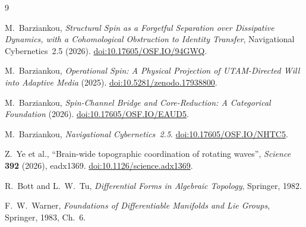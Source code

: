 \documentclass[11pt]{article}
\theoremstyle{definition}
\begin{document}
\begin{thebibliography}{9}

M.~Barziankou,
\emph{Structural Spin as a Forgetful Separation over Dissipative
Dynamics, with a Cohomological Obstruction to Identity Transfer},
Navigational Cybernetics~2.5 (2026).
\href{https://doi.org/10.17605/OSF.IO/94GWQ}
{doi:10.17605/OSF.IO/94GWQ}.

M.~Barziankou,
\emph{Operational Spin: A Physical Projection of UTAM-Directed Will into
Adaptive Media} (2025).
\href{https://doi.org/10.5281/zenodo.17938800}
{doi:10.5281/zenodo.17938800}.

M.~Barziankou,
\emph{Spin-Channel Bridge and Core-Reduction: A Categorical Foundation}
(2026).
\href{https://doi.org/10.17605/OSF.IO/EAUD5}
{doi:10.17605/OSF.IO/EAUD5}.

M.~Barziankou,
\emph{Navigational Cybernetics~2.5}.
\href{https://doi.org/10.17605/OSF.IO/NHTC5}
{doi:10.17605/OSF.IO/NHTC5}.

Z.~Ye et al.,
``Brain-wide topographic coordination of rotating waves'',
\emph{Science} \textbf{392} (2026), eadx1369.
\href{https://doi.org/10.1126/science.adx1369}
{doi:10.1126/science.adx1369}.

R.~Bott and L.~W.~Tu,
\emph{Differential Forms in Algebraic Topology},
Springer, 1982.

F.~W.~Warner,
\emph{Foundations of Differentiable Manifolds and Lie Groups},
Springer, 1983, Ch.~6.

\end{thebibliography}
\end{document}
